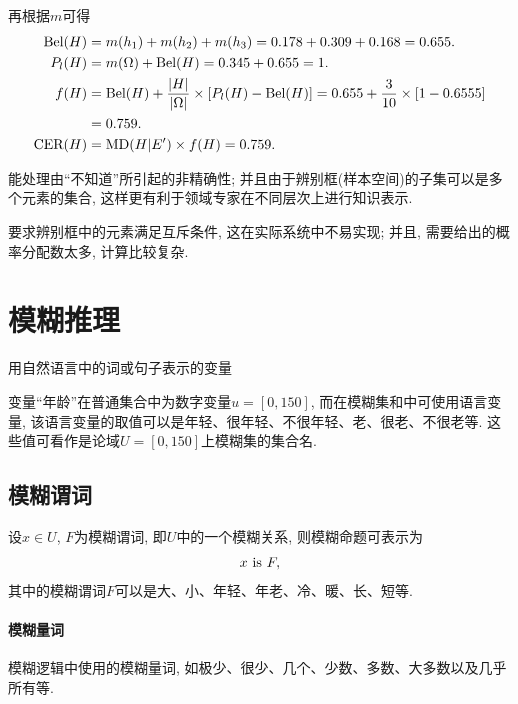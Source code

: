 再根据$m$可得
\begin{align*}
\textup{Bel}(H)&=m({h_1})+m({h_2})+m({h_3})=0.178+0.309+0.168=0.655.\\
  P_l(H)&=m(\Omega)+\textup{Bel}(H)=0.345+0.655=1.\\
  f(H)  &=\textup{Bel}(H)+\frac{|H|}{|\Omega|} \times[P_l(H)-\textup{Bel}(H)]=0.655+\frac{3}{10} \times[1-0.6555] \\
        &=0.759.\\
  \textup{CER}(H)&=\textup{MD}(H|E')\times f(H)=0.759.
\end{align*}

\begin{tcolorbox}[title=\textbf{优点}]
    能处理由“不知道”所引起的非精确性; 并且由于辨别框(样本空间)的子集可以是多个元素的集合, 这样更有利于领域专家在不同层次上进行知识表示.
\end{tcolorbox}

\begin{tcolorbox}[title=\textbf{缺点}]
    要求辨别框中的元素满足互斥条件, 这在实际系统中不易实现; 并且, 需要给出的概率分配数太多, 计算比较复杂.
\end{tcolorbox}
\section{模糊推理}
用自然语言中的词或句子表示的变量
\begin{example}
变量“年龄”在普通集合中为数字变量$u=[0, 150]$, 而在模糊集和中可使用语言变量, 该语言变量的取值可以是年轻、很年轻、不很年轻、老、很老、不很老等. 这些值可看作是论域$U=[0, 150]$上模糊集的集合名.
\end{example}
\subsection{模糊谓词}
设$x\in U$, $F$为模糊谓词, 即$U$中的一个模糊关系, 则模糊命题可表示为
 \begin{align}
        x\,\,  \textup{is} \,\, F,
 \end{align}
其中的模糊谓词$F$可以是大、小、年轻、年老、冷、暖、长、短等.
\paragraph{模糊量词}
模糊逻辑中使用的模糊量词, 如极少、很少、几个、少数、多数、大多数以及几乎所有等.

